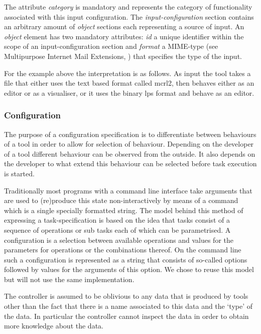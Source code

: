 \documentclass{article}
\begin{document}
   \noindent The attribute \textit{category} is mandatory and represents the
   category of functionality associated with this input configuration. The
   \textit{input-configuration} section contains an arbitrary amount of
   \textit{object} sections each representing a source of input. An
   \textit{object} element has two mandatory attributes: \textit{id} a unique
   identifier within the scope of an input-configuration section and
   \textit{format} a MIME-type (see Multipurpose Internet Mail Extensions,
   \cite{rfc2822}) that specifies the type of the input.

   For the example above the interpretation is as follows. As input the tool
   takes a file that either uses the text based format called mcrl2, then
   behaves either as an editor or as a visualiser, or it uses the binary lps
   format and behave as an editor.

  \subsubsection{Configuration} \label{ss:implementation_configuration}

   The purpose of a configuration specification is to differentiate between
   behaviours of a tool in order to allow for selection of behaviour. Depending
   on the developer of a tool different behaviour can be observed from the
   outside. It also depends on the developer to what extend this behaviour can
   be selected before task execution is started.

   Traditionally most programs with a command line interface take arguments
   that are used to (re)produce this state non-interactively by means of a
   command which is a single specially formatted string. The model behind this
   method of expressing a task-specification is based on the idea that tasks
   consist of a sequence of operations or sub tasks each of which can be
   parametrised.  A configuration is a selection between available operations
   and values for the parameters for operations or the combinations thereof. On
   the command line such a configuration is represented as a string that
   consists of so-called options followed by values for the arguments of this
   option. We chose to reuse this model but will not use the same
   implementation.

   The controller is assumed to be oblivious to any data that is produced by
   tools other than the fact that there is a name associated to this data and
   the `type' of the data.  In particular the controller cannot inspect the
   data in order to obtain more knowledge about the data.
\end{document}
